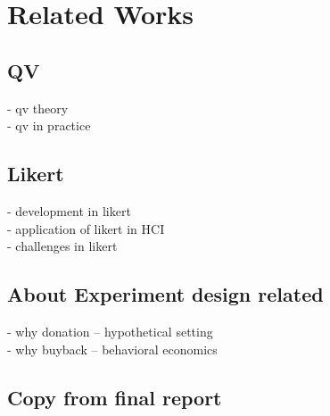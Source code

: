 \section{Related Works} \label{related_works}
\subsection{QV}
- qv theory\\
- qv in practice \\

\subsection{Likert}
- development in likert \\
- application of likert in HCI\\
- challenges in likert \\

\subsection{About Experiment design related}
- why donation -- hypothetical setting\\
- why buyback -- behavioral economics

\subsection{Copy from final report }